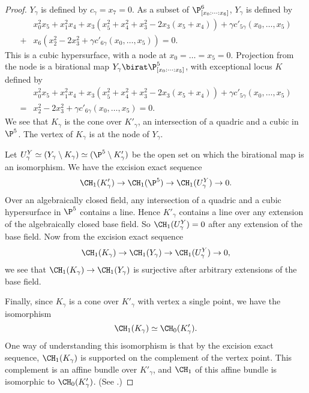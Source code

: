 \begin{proof}
  $Y_\gamma$ is defined by $c_\gamma = x_7 = 0$. As a subset of $\P^6_{[x_0:\dots:x_6]}$, $Y_\gamma$ is defined by
\begin{align*}
  &x_0^2x_5 + x_1^2x_4 + x_3\left(x_5^2 + x_4^2 + x_3^2 - 2x_3(x_5 + x_4)\right) + \gamma c'_{5\gamma}(x_0,\dots,x_5)\\
 + &x_6\left(x_2^2 - 2x_3^2 + \gamma c'_{6\gamma}(x_0,\dots,x_5)\right) = 0.
\end{align*}
This is a cubic hypersurface, with a node at $x_0=\dots=x_5=0$. Projection from the node is a birational map $Y_\gamma \birat \P^5_{[x_0:\dots:x_5]}$, with exceptional locus $K$ defined by
\begin{align*}
  &x_0^2x_5 + x_1^2x_4 + x_3\left(x_5^2 + x_4^2 + x_3^2 - 2x_3(x_5 + x_4)\right)+ \gamma c'_{5\gamma}(x_0,\dots,x_5) \\
=&x_2^2 - 2x_3^2 + \gamma c'_{6\gamma}(x_0,\dots,x_5)=0.
\end{align*}
We see that $K_\gamma$ is the cone over $K'_\gamma$, an intersection of a quadric and a cubic in $\P^5$. The vertex of $K_\gamma$ is at the node of $Y_\gamma$.

Let $U^Y_{\gamma} \simeq (Y_\gamma \setminus K_\gamma) \simeq (\P^5 \setminus K'_\gamma)$ be the open set on which the birational map is an isomorphism. We have the excision exact sequence
\[\CH_1(K'_\gamma) \to \CH_1(\P^5) \to \CH_1(U^Y_{\gamma}) \to 0.\]
Over an algebraically closed field, any intersection of a quadric and a cubic hypersurface in $\P^5$ contains a line. Hence $K'_\gamma$ contains a line over any extension of the algebraically closed base field. So $\CH_1(U^Y_{\gamma}) = 0$ after any extension of the base field. Now from the excision exact sequence
\[\CH_1(K_\gamma) \to \CH_1(Y_\gamma) \to \CH_1(U^Y_{\gamma}) \to 0,\]
we see that $\CH_1(K_\gamma) \to \CH_1(Y_\gamma)$ is surjective after arbitrary extensions of the base field. 

Finally, since $K_\gamma$ is a cone over $K'_\gamma$ with vertex a single point, we have the isomorphism
\[\CH_1(K_\gamma) \simeq \CH_0(K'_\gamma). \]
One way of understanding this isomorphism is that by the excision exact sequence, $\CH_1(K_\gamma)$ is supported on the complement of the vertex point. This complement is an affine bundle over $K'_\gamma$, and $\CH_1$ of this affine bundle is isomorphic to $\CH_0(K'_\gamma)$. (See \cite[Proposition 1.9]{FultonIntersectionTheory}.)
\end{proof}

